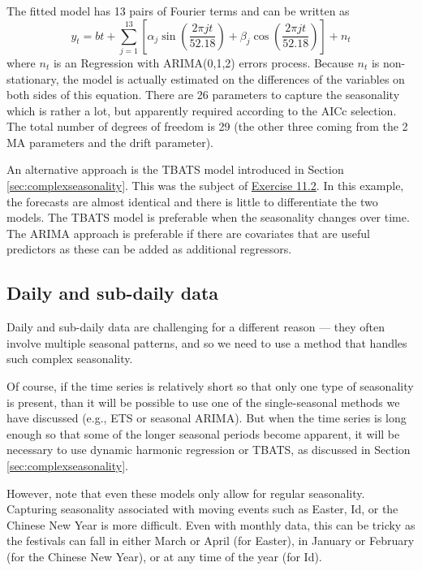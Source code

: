 \documentclass[]{book}
\begin{document}
The fitted model has 13 pairs of Fourier terms and can be written as
\[
  y_t = bt + \sum_{j=1}^{13} \left[ \alpha_j\sin\left(\frac{2\pi j t}{52.18}\right) + \beta_j\cos\left(\frac{2\pi j t}{52.18}\right) \right] + n_t
\]
where \(n_t\) is an Regression with ARIMA(0,1,2) errors process. Because \(n_t\) is non-stationary, the model is actually estimated on the differences of the variables on both sides of this equation. There are 26 parameters to capture the seasonality which is rather a lot, but apparently required according to the AICc selection. The total number of degrees of freedom is 29 (the other three coming from the 2 MA parameters and the drift parameter).

An alternative approach is the TBATS model introduced in Section \ref{sec:complexseasonality}. This was the subject of \href{sec-ex-11.html}{Exercise 11.2}. In this example, the forecasts are almost identical and there is little to differentiate the two models. The TBATS model is preferable when the seasonality changes over time. The ARIMA approach is preferable if there are covariates that are useful predictors as these can be added as additional regressors.

\hypertarget{daily-and-sub-daily-data}{%
\subsection*{Daily and sub-daily data}\label{daily-and-sub-daily-data}}

Daily and sub-daily data are challenging for a different reason --- they often involve multiple seasonal patterns, and so we need to use a method that handles such complex seasonality.

Of course, if the time series is relatively short so that only one type of seasonality is present, than it will be possible to use one of the single-seasonal methods we have discussed (e.g., ETS or seasonal ARIMA). But when the time series is long enough so that some of the longer seasonal periods become apparent, it will be necessary to use dynamic harmonic regression or TBATS, as discussed in Section \ref{sec:complexseasonality}.

However, note that even these models only allow for regular seasonality. Capturing seasonality associated with moving events such as Easter, Id, or the Chinese New Year is more difficult. Even with monthly data, this can be tricky as the festivals can fall in either March or April (for Easter), in January or February (for the Chinese New Year), or at any time of the year (for Id).
\end{document}
